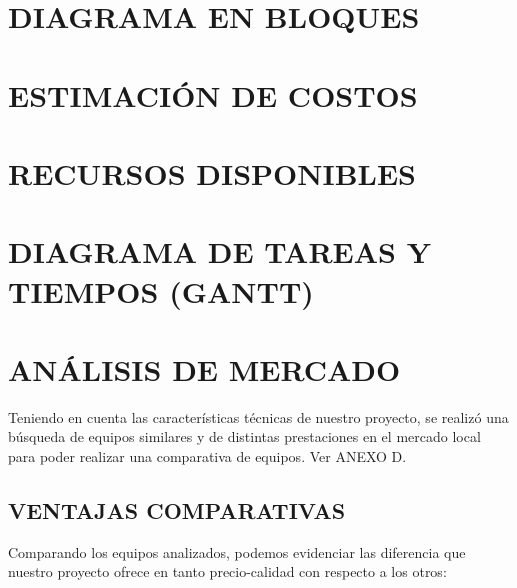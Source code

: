 \documentclass[10pt, conference, final, twocolumn, sansserif]{IEEEtran}
\begin{document}
\section{DIAGRAMA EN BLOQUES}

\section{ESTIMACIÓN DE COSTOS}

\section{RECURSOS DISPONIBLES}

\section{DIAGRAMA DE TAREAS Y TIEMPOS (GANTT)}

\section{ANÁLISIS DE MERCADO}
Teniendo en cuenta las características técnicas de nuestro proyecto, se realizó una búsqueda de equipos similares y de distintas prestaciones en el mercado local para poder realizar una comparativa de equipos. Ver ANEXO D.

\subsection{VENTAJAS COMPARATIVAS}
Comparando los equipos analizados, podemos evidenciar las diferencia que nuestro proyecto ofrece en tanto precio-calidad con respecto a los otros:
\end{document}
